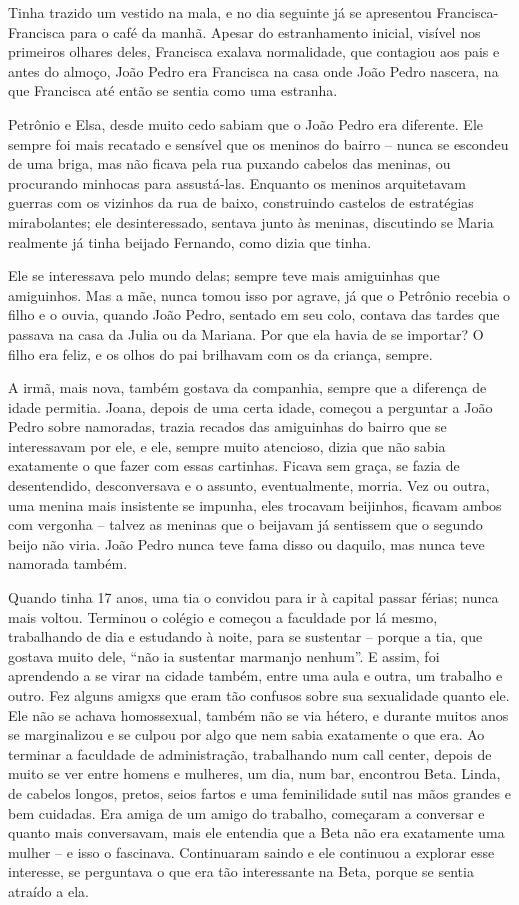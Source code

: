 \documentclass[11pt,a4paper,twoside,openany]{book}
\begin{document}
Tinha trazido um vestido na mala, e no dia seguinte já se apresentou Francisca-Francisca para o café da manhã. Apesar do estranhamento inicial, visível nos primeiros olhares deles, Francisca exalava normalidade, que contagiou aos pais e antes do almoço, João Pedro era Francisca na casa onde João Pedro nascera, na que Francisca até então se sentia como uma estranha.

Petrônio e Elsa, desde muito cedo sabiam que o João Pedro era diferente. Ele sempre foi mais recatado e sensível que os meninos do bairro – nunca se escondeu de uma briga, mas não ficava pela rua puxando cabelos das meninas, ou procurando minhocas para assustá-las. Enquanto os meninos arquitetavam guerras com os vizinhos da rua de baixo, construindo castelos de estratégias mirabolantes; ele desinteressado, sentava junto às meninas, discutindo se Maria realmente já tinha beijado Fernando, como dizia que tinha.

Ele se interessava pelo mundo delas; sempre teve mais amiguinhas que amiguinhos. Mas a mãe, nunca tomou isso por agrave, já que o Petrônio recebia o filho e o ouvia, quando João Pedro, sentado em seu colo, contava das tardes que passava na casa da Julia ou da Mariana. Por que ela havia de se importar? O filho era feliz, e os olhos do pai brilhavam com os da criança, sempre.

A irmã, mais nova, também gostava da companhia, sempre que a diferença de idade permitia. Joana, depois de uma certa idade, começou a perguntar a João Pedro sobre namoradas, trazia recados das amiguinhas do bairro que se interessavam por ele, e ele, sempre muito atencioso, dizia que não sabia exatamente o que fazer com essas cartinhas. Ficava sem graça, se fazia de desentendido, desconversava e o assunto, eventualmente, morria. Vez ou outra, uma menina mais insistente se impunha, eles trocavam beijinhos, ficavam ambos com vergonha – talvez as meninas que o beijavam já sentissem que o segundo beijo não viria. João Pedro nunca teve fama disso ou daquilo, mas nunca teve namorada também.

Quando tinha 17 anos, uma tia o convidou para ir à capital passar férias; nunca mais voltou. Terminou o colégio e começou a faculdade por lá mesmo, trabalhando de dia e estudando à noite, para se sustentar – porque a tia, que gostava muito dele, “não ia sustentar marmanjo nenhum”. E assim, foi aprendendo a se virar na cidade também, entre uma aula e outra, um trabalho e outro. Fez alguns amigxs que eram tão confusos sobre sua sexualidade quanto ele. Ele não se achava homossexual, também não se via hétero, e durante muitos anos se marginalizou e se culpou por algo que nem sabia exatamente o que era. Ao terminar a faculdade de administração, trabalhando num call center, depois de muito se ver entre homens e mulheres, um dia, num bar, encontrou Beta. Linda, de cabelos longos, pretos, seios fartos e uma feminilidade sutil nas mãos grandes e bem cuidadas. Era amiga de um amigo do trabalho, começaram a conversar e quanto mais conversavam, mais ele entendia que a Beta não era exatamente uma mulher – e isso o fascinava. Continuaram saindo e ele continuou a explorar esse interesse, se perguntava o que era tão interessante na Beta, porque se sentia atraído a ela. 
\end{document}
